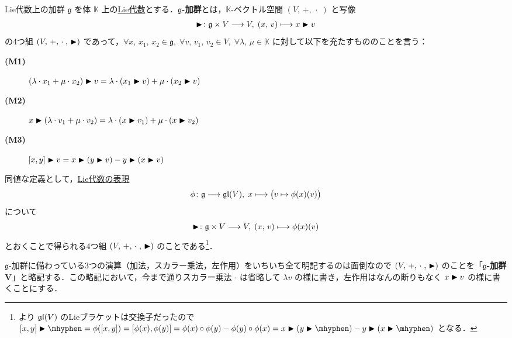 \documentclass[rep_main]{subfiles}
\begin{document}
\begin{myaxiom}[label=ax:g-module]{Lie代数上の加群}
    $\mathfrak{g}$ を体 $\mathbb{K}$ 上の\hyperref[ax:LieAlg]{Lie代数}とする．$\bm{\mathfrak{g}}$\textbf{-加群}とは，$\mathbb{K}$-ベクトル空間 $(V,\, +,\, \cdot\;)$ と写像
    \begin{align}
        \blacktriangleright \colon \mathfrak{g} \times V \longrightarrow V,\; (x,\, v) \longmapsto x \blacktriangleright v
    \end{align}
    の4つ組 $(V,\, +,\, \cdot\;,\, \blacktriangleright)$ であって，$\forall x,\, x_1,\, x_2 \in \mathfrak{g},\; \forall v,\, v_1,\, v_2 \in V,\; \forall \lambda,\, \mu \in \mathbb{K}$ に対して以下を充たすもののことを言う：
    \begin{description}
        \item[\textbf{(M1)}] $(\lambda \cdot x_1 + \mu \cdot x_2) \blacktriangleright v = \lambda \cdot (x_1 \blacktriangleright v) + \mu \cdot (x_2 \blacktriangleright v)$
        \item[\textbf{(M2)}] $x \blacktriangleright (\lambda \cdot v_1 + \mu \cdot v_2) = \lambda \cdot (x \blacktriangleright v_1) + \mu \cdot (x \blacktriangleright v_2)$
        \item[\textbf{(M3)}] $\comm{x}{y} \btr v = x \btr (y \btr v) - y \btr (x \btr v)$
    \end{description}
    \tcblower
    同値な定義として，\hyperref[def:rep-LieAlg]{Lie代数の表現}
    \begin{align}
        \phi \colon \mathfrak{g} \longrightarrow \mathfrak{gl} (V),\; x \longmapsto \bigl( v \mapsto \phi(x)(v) \bigr) 
    \end{align}
    について
    \begin{align}
        \blacktriangleright \colon \mathfrak{g} \times V \longrightarrow V,\; (x,\, v) \longmapsto \phi(x)(v)
    \end{align}
    とおくことで得られる4つ組 $(V,\, +,\, \cdot\;,\, \blacktriangleright)$ のことである\footnote{より $\mathfrak{gl} (V)$ のLieブラケットは交換子だったので $\comm{x}{y} \btr \mhyphen = \phi(\comm{x}{y}) = \comm{\phi(x)}{\phi(y)} = \phi(x) \circ \phi(y) - \phi(y) \circ \phi(x) = x \btr (y\btr \mhyphen) - y \btr (x \btr \mhyphen)$ となる．}．
\end{myaxiom}

\begin{marker}
    $\mathfrak{g}$-加群に備わっている3つの演算（加法，スカラー乗法，左作用）をいちいち全て明記するのは面倒なので $(V,\, +,\, \cdot\;,\, \blacktriangleright)$ のことを「$\bm{\mathfrak{g}}$\textbf{-加群} $\bm{V}$」と略記する．この略記において，今まで通りスカラー乗法 $\cdot$ は省略して $\lambda v$ の様に書き，左作用はなんの断りもなく $x \blacktriangleright v$ の様に書くことにする．
\end{marker}
\end{document}
